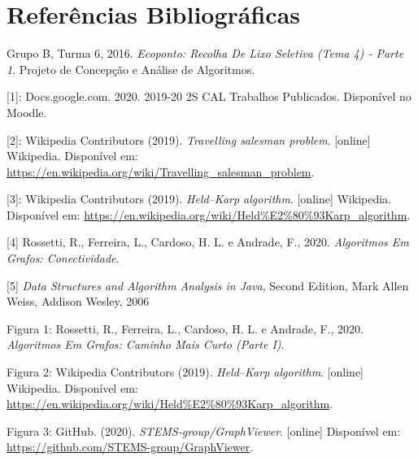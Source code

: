 \documentclass[article, a4paper, 12pt, oneside]{memoir}
\begin{document}
\chapter[Referências Bibliográficas][Referências Bibliográficas]{Referências Bibliográficas} \label{\thechapter}
Grupo B, Turma 6, 2016. \textit{Ecoponto: Recolha De Lixo Seletiva (Tema 4) ‐ Parte 1}. Projeto de Concepção e Análise de Algoritmos.

[1]: Docs.google.com. 2020. 2019-20 2S CAL Trabalhos Publicados. Disponível no Moodle.

[2]: Wikipedia Contributors (2019). \textit{Travelling salesman problem}. [online] Wikipedia. Disponível em: \url{https://en.wikipedia.org/wiki/Travelling_salesman_problem}.

[3]: Wikipedia Contributors (2019). \textit{Held–Karp algorithm}. [online] Wikipedia. Disponível em: \url{https://en.wikipedia.org/wiki/Held%E2%80%93Karp_algorithm}.

[4] Rossetti, R., Ferreira, L., Cardoso, H. L. e Andrade, F., 2020. \textit{Algoritmos Em Grafos: Conectividade}.

[5] \textit{Data Structures and Algorithm Analysis in Java}, Second
Edition, Mark Allen Weiss, Addison Wesley, 2006 

Figura 1: Rossetti, R., Ferreira, L., Cardoso, H. L. e Andrade, F., 2020. \textit{Algoritmos Em Grafos: Caminho Mais Curto (Parte I)}.

Figura 2: Wikipedia Contributors (2019). \textit{Held–Karp algorithm}. [online] Wikipedia. Disponível em: \url{https://en.wikipedia.org/wiki/Held%E2%80%93Karp_algorithm}.

Figura 3: GitHub. (2020). \textit{STEMS-group/GraphViewer}. [online] Disponível em: \url{https://github.com/STEMS-group/GraphViewer}.

‌

‌

\newpage
\end{document}

